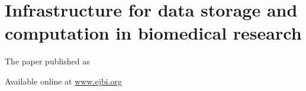 \chapter{Infrastructure for data storage and computation in biomedical research}\label{app:infrastructure}
The paper \cite{kulhanek2010c} published as
 

Available online at \href{http://www.ejbi.org/en/ejbi/article/49-en-infrastructure-for-data-storage-and-computation-in-biomedical-research.html}{www.ejbi.org}


%